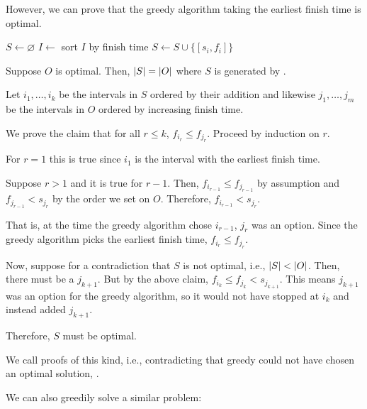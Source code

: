 However, we can prove that the greedy algorithm taking the earliest finish time is optimal.

\begin{algorithm}[H]
  \caption{\label{alg:g:is}}
  \begin{algorithmic}[1]
    \State $S \gets \varnothing$
    \State $I \gets$ sort $I$ by finish time
    \State $S \gets S \cup \{[s_i,f_i]\}$
    \EndIf
    \EndFor
  \end{algorithmic}
\end{algorithm}

\begin{prop}
  Suppose $O$ is optimal. Then, $\abs{S} = \abs{O}$ where $S$ is generated by .
\end{prop}
\begin{prf}
  Let $i_1,\dotsc,i_k$ be the intervals in $S$ ordered by their addition
  and likewise $j_1,\dotsc,j_m$ be the intervals in $O$ ordered by increasing finish time.

  We prove the claim that for all $r \leq k$, $f_{i_r} \leq f_{j_r}$.
  Proceed by induction on $r$.

  For $r=1$ this is true since $i_1$ is the interval with the earliest finish time.

  Suppose $r > 1$ and it is true for $r-1$.
  Then, $f_{i_{r-1}} \leq f_{j_{r-1}}$ by assumption and $f_{j_{r-1}} < s_{j_r}$
  by the order we set on $O$.
  Therefore, $f_{i_{r-1}} < s_{j_r}$.

  That is, at the time the greedy algorithm chose $i_{r-1}$, $j_r$ was an option.
  Since the greedy algorithm picks the earliest finish time, $f_{i_r} \leq f_{j_r}$.

  Now, suppose for a contradiction that $S$ is not optimal, i.e., $\abs{S} < \abs{O}$.
  Then, there must be a $j_{k+1}$.
  But by the above claim, $f_{i_k} \leq f_{j_k} < s_{j_{k+1}}$.
  This means $j_{k+1}$ was an option for the greedy algorithm,
  so it would not have stopped at $i_k$ and instead added $j_{k+1}$.

  Therefore, $S$ must be optimal.
\end{prf}

We call proofs of this kind, i.e., contradicting that greedy could not have
chosen an optimal solution, .

We can also greedily solve a similar problem:

